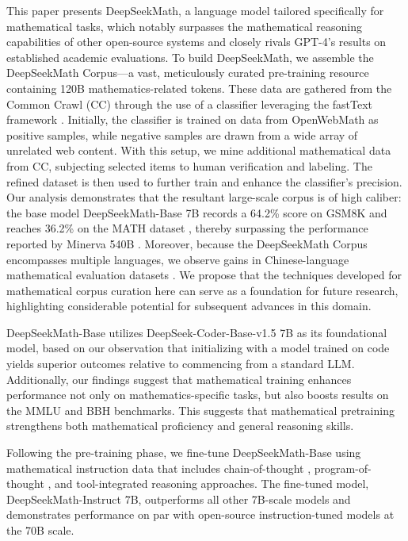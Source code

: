 This paper presents DeepSeekMath, a language model tailored specifically for mathematical tasks, which notably surpasses the mathematical reasoning capabilities of other open-source systems and closely rivals GPT-4's results on established academic evaluations. To build DeepSeekMath, we assemble the DeepSeekMath Corpus—a vast, meticulously curated pre-training resource containing 120B mathematics-related tokens. These data are gathered from the Common Crawl (CC) through the use of a classifier leveraging the fastText framework \citep{joulin2016fasttext}. Initially, the classifier is trained on data from OpenWebMath \citep{openwebmath} as positive samples, while negative samples are drawn from a wide array of unrelated web content. With this setup, we mine additional mathematical data from CC, subjecting selected items to human verification and labeling. The refined dataset is then used to further train and enhance the classifier's precision. Our analysis demonstrates that the resultant large-scale corpus is of high caliber: the base model DeepSeekMath-Base 7B records a 64.2\% score on GSM8K \citep{gsm8k} and reaches 36.2\% on the MATH dataset \citep{MATH}, thereby surpassing the performance reported by Minerva 540B \citep{minerva}. Moreover, because the DeepSeekMath Corpus encompasses multiple languages, we observe gains in Chinese-language mathematical evaluation datasets \citep{wei2023cmath,agieval}. We propose that the techniques developed for mathematical corpus curation here can serve as a foundation for future research, highlighting considerable potential for subsequent advances in this domain.

DeepSeekMath-Base utilizes DeepSeek-Coder-Base-v1.5 7B \citep{deepseek-coder} as its foundational model, based on our observation that initializing with a model trained on code yields superior outcomes relative to commencing from a standard LLM. Additionally, our findings suggest that mathematical training enhances performance not only on mathematics-specific tasks, but also boosts results on the MMLU \citep{mmlu} and BBH \citep{bbh} benchmarks. This suggests that mathematical pretraining strengthens both mathematical proficiency and general reasoning skills.

Following the pre-training phase, we fine-tune DeepSeekMath-Base using mathematical instruction data that includes chain-of-thought \citep{cot}, program-of-thought \citep{pot,pal}, and tool-integrated reasoning \citep{tora} approaches. The fine-tuned model, DeepSeekMath-Instruct 7B, outperforms all other 7B-scale models and demonstrates performance on par with open-source instruction-tuned models at the 70B scale.

